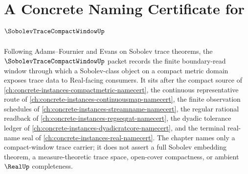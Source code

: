 \chapter{A Concrete Naming Certificate for $\SobolevTraceCompactWindowUp$}
\label{ch:concrete-instances-sobolev-trace-compact-window-namecert}

Following Adams--Fournier and Evans on Sobolev trace theorems, the $\SobolevTraceCompactWindowUp$ packet records the finite boundary-read window through which a Sobolev-class object on a compact metric domain exposes trace data to Real-facing consumers. It sits after the compact source of \autoref{ch:concrete-instances-compactmetric-namecert}, the continuous representative route of \autoref{ch:concrete-instances-continuousmap-namecert}, the finite observation schedules of \autoref{ch:concrete-instances-streamname-namecert}, the regular rational readback of \autoref{ch:concrete-instances-regseqrat-namecert}, the dyadic tolerance ledger of \autoref{ch:concrete-instances-dyadicratcore-namecert}, and the terminal real-name seal of \autoref{ch:concrete-instances-real-namecert}. The chapter names only a compact-window trace carrier; it does not assert a full Sobolev embedding theorem, a measure-theoretic trace space, open-cover compactness, or ambient $\RealUp$ completeness.

